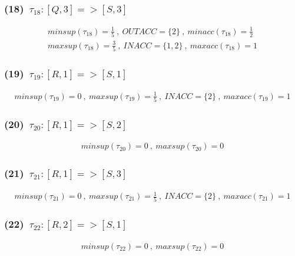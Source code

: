 \documentclass[a4paper,12pt]{jarticle}
\begin{document}
\subsubsection*{(18)~$\tau_{18}:[Q,3]=>[S,3]$}
\vspace{-4mm}
%
\begin{align*}
 minsup(\tau_{18})=\frac{1}{5}~,~OUTACC=\{2\}~,~minacc(\tau_{18})=\frac{1}{2}\\
 maxsup(\tau_{18})=\frac{3}{5}~,~INACC=\{1,2\}~,~maxacc(\tau_{18})=1
\end{align*}
%
\vspace{-10mm}
\subsubsection*{(19)~$\tau_{19}:[R,1]=>[S,1]$}
\vspace{-4mm}
%
\begin{align*}
 minsup(\tau_{19})=0~,~maxsup(\tau_{19})=\frac{1}{5}~,~INACC=\{2\}~,~maxacc(\tau_{19})=1
\end{align*}
%
\vspace{-10mm}
\subsubsection*{(20)~$\tau_{20}:[R,1]=>[S,2]$}
\vspace{-4mm}
%
\begin{align*}
 minsup(\tau_{20})=0~,~maxsup(\tau_{20})=0
\end{align*}
%
\vspace{-10mm}
\subsubsection*{(21)~$\tau_{21}:[R,1]=>[S,3]$}
\vspace{-4mm}
%
\begin{align*}
 minsup(\tau_{21})=0~,~maxsup(\tau_{21})=\frac{1}{5}~,~INACC=\{2\}~,~maxacc(\tau_{21})=1
\end{align*}
%
\vspace{-10mm}
\subsubsection*{(22)~$\tau_{22}:[R,2]=>[S,1]$}
\vspace{-4mm}
%
\begin{align*}
 minsup(\tau_{22})=0~,~maxsup(\tau_{22})=0
\end{align*}
%
\vspace{-10mm}
\end{document}
